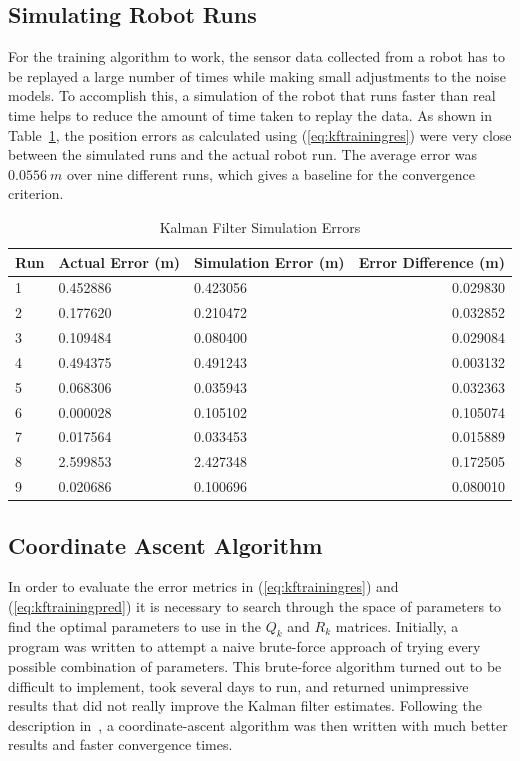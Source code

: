 \subsection{Simulating Robot Runs}%
\label{sec:kfSimulation}
For the training algorithm to work, the sensor data collected from a robot has to be replayed a large number of times while making small adjustments to the noise models.
To accomplish this, a simulation of the robot that runs faster than real time helps to reduce the amount of time taken to replay the data.
As shown in Table~\ref{tab:kfSimulationErrors}, the position errors as calculated using (\ref{eq:kftrainingres}) were very close between the simulated runs and the actual robot run.
The average error was $0.0556~m$ over nine different runs, which gives a baseline for the convergence criterion.

\begin{table}[ht!]
\caption{Kalman Filter Simulation Errors}
\small
\centering
\begin{tabular}{@{}lllr@{}} \toprule
Run & Actual Error (m)  & Simulation Error (m) & Error Difference (m) \\ \midrule
1   & 0.452886          & 0.423056             & 0.029830             \\
2   & 0.177620          & 0.210472             & 0.032852             \\
3   & 0.109484          & 0.080400             & 0.029084             \\
4   & 0.494375          & 0.491243             & 0.003132             \\
5   & 0.068306          & 0.035943             & 0.032363             \\
6   & 0.000028          & 0.105102             & 0.105074             \\
7   & 0.017564          & 0.033453             & 0.015889             \\
8   & 2.599853          & 2.427348             & 0.172505             \\
9   & 0.020686          & 0.100696             & 0.080010             \\ \bottomrule
\end{tabular}%
\label{tab:kfSimulationErrors}
\end{table}

\subsection{Coordinate Ascent Algorithm}%
\label{sec:coordinateAscent}
In order to evaluate the error metrics in (\ref{eq:kftrainingres}) and (\ref{eq:kftrainingpred}) it is necessary to search through the space of parameters to find the optimal parameters to use in the $Q_k$ and $R_k$ matrices.
Initially, a program was written to attempt a naive brute-force approach of trying every possible combination of parameters.
This brute-force algorithm turned out to be difficult to implement, took several days to run, and returned unimpressive results that did not really improve the Kalman filter estimates.
Following the description in~\cite{Abbeel-RSS-05}, a coordinate-ascent algorithm was then written with much better results and faster convergence times.

